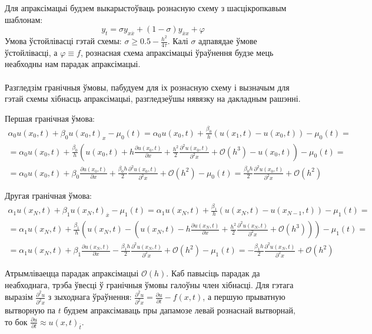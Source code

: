 Для апраксімацыі будзем выкарыстоўваць рознасную схему з шасцікропкавым шаблонам:
\[ y_t = \sigma y_{x \overline{x}} + (1-\sigma) y_{\overline{x}x} + \varphi \]
Умова ўстойлівасці гэтай схемы:  $\sigma \ge 0.5 - \frac{h^2}{4\tau}$. Калі $\sigma$ адпавядае ўмове ўстойлівасці, а $\varphi \equiv f$, рознасная схема апраксімацыі ўраўнення будзе мець неабходны нам парадак апраксімацыі. \\ \\
Разгледзім гранічныя ўмовы, пабудуем для іх рознасную схему і вызначым для гэтай схемы хібнасць апраксімацыі, разгледзеўшы нявязку на дакладным рашэнні. \par
\vspace{5mm}
Першая гранічная ўмова:
\begin{multline}
\alpha _0 u(x_0,t) + \beta _0 u(x_0,t)_x - \mu _0(t) = \alpha _0 u(x_0,t) + \frac{\beta_0}{h}(u(x_1, t) - u(x_0, t)) - \mu _0(t) = \\
= \alpha _0 u(x_0, t) + \frac{\beta _0}{h}(u(x_0, t) + h \frac{\partial u(x_0, t)}{\partial x} + \frac{h^2}{2} \frac{\partial ^2 u(x_0, t)}{\partial ^2 x} + \mathcal{O}(h^3) - u(x_0, t)) -\mu _0(t) = \\
= \alpha _0 u(x_0, t) + \beta _0 \frac{\partial u(x_0, t)}{\partial x} + \frac{\beta _0 h}{2} \frac{\partial ^2 u(x_0, t)}{\partial ^2 x} + \mathcal{O}(h^2) -\mu _0(t) = \frac{\beta _0 h}{2} \frac{\partial ^2 u(x_0, t)}{\partial ^2 x} + \mathcal{O}(h^2)
\end{multline}

Другая гранічная ўмова:
\begin{multline}
\alpha _1 u(x_N,t) + \beta _1 u(x_N,t)_{\overline{x}} - \mu _1(t) = \alpha _1 u(x_N,t) + \frac{\beta_1}{h}(u(x_N, t) - u(x_{N-1}, t)) - \mu _1(t) = \\
= \alpha _1 u(x_N, t) + \frac{\beta _1}{h}(u(x_N, t) - (u(x_N, t) - h \frac{\partial u(x_N, t)}{\partial x} + \frac{h^2}{2} \frac{\partial ^2 u(x_N, t)}{\partial ^2 x} + \mathcal{O}(h^3))) -\mu _1(t) = \\
= \alpha _1 u(x_N, t) + \beta _1 \frac{\partial u(x_N, t)}{\partial x} - \frac{\beta _1 h}{2} \frac{\partial ^2 u(x_N, t)}{\partial ^2 x} + \mathcal{O}(h^2) -\mu _1(t) = -\frac{\beta _1 h}{2} \frac{\partial ^2 u(x_N, t)}{\partial ^2 x} + \mathcal{O}(h^2)
\end{multline}

Атрымліваецца парадак апраксімацыі $\mathcal{O}(h)$. Каб павысіць парадак да неабходнага, трэба ўвесці ў гранічныя ўмовы галоўны член хібнасці. Для гэтага выразім $\frac{\partial ^2 u}{\partial ^2 x}$ з зыходнага ўраўнення: $\frac{\partial ^2 u}{\partial ^2 x} = \frac{\partial u}{\partial t} - f(x,t)$, а першую прыватную вытворную па $t$ будзем апраксімаваць пры дапамозе левай рознаснай вытворнай, то бок $\frac{\partial u}{\partial t} \approx u(x,t)_{\overline{t}}.$ \\ \\

